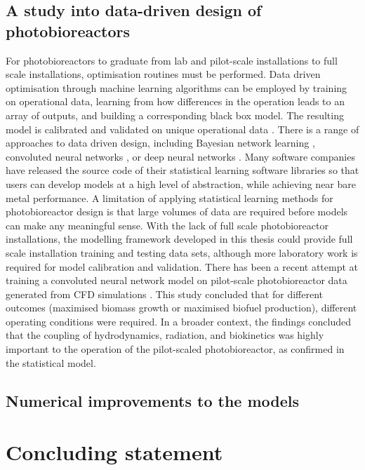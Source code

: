 \subsection{A study into data-driven design of photobioreactors}
For photobioreactors to graduate from lab and pilot-scale installations to full scale installations, optimisation routines must be performed. Data driven optimisation through machine learning algorithms can be employed by training on operational data, learning from how differences in the operation leads to an array of outputs, and building a corresponding black box model. The resulting model is calibrated and validated on unique operational data \cite{Pedregosa2011}. There is a range of approaches to data driven design, including Bayesian network learning \cite{Hu2018}, convoluted neural networks \cite{RioChanona2019}, or deep neural networks \cite{Deepa2018}. Many software companies have released the source code of their statistical learning software libraries so that users can develop models at a high level of abstraction, while achieving near bare metal performance.
\skippingparagraph
A limitation of applying statistical learning methods for photobioreactor design is that large volumes of data are required before models can make any meaningful sense. With the lack of full scale photobioreactor installations, the modelling framework developed in this thesis could provide full scale installation training and testing data sets, although more laboratory work is required for model calibration and validation. There has been a recent attempt at training a convoluted neural network model on pilot-scale photobioreactor data generated from CFD simulations \cite{RioChanona2019}. This study concluded that for different outcomes (maximised biomass growth or maximised biofuel production), different operating conditions were required. In a broader context, the findings concluded that the coupling of hydrodynamics, radiation, and biokinetics was highly important to the operation of the pilot-scaled photobioreactor, as confirmed in the statistical model. 


\subsection{Numerical improvements to the models}

\section{Concluding statement}

\skippingparagraph



